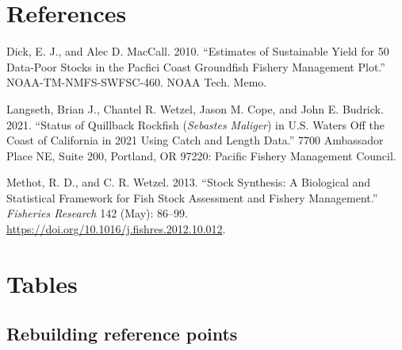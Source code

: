 \documentclass[11pt,
  english,
  a4paper,
]{article}
\begin{document}
\leavevmode\tagmcend\tagstructend\par

\clearpage


\hypertarget{references}{%
\section{References}\label{references}}

\leavevmode\tagmcend\tagstructend


\hypertarget{refs}{}
\leavevmode\hypertarget{ref-DickandMacCall_dbsra_2010}{}%
Dick, E. J., and Alec D. MacCall. 2010. ``Estimates of Sustainable Yield for 50 Data-Poor Stocks in the Pacfici Coast Groundfish Fishery Management Plot.'' NOAA-TM-NMFS-SWFSC-460. NOAA Tech. Memo.

\leavevmode\hypertarget{ref-Langseth_status_2021}{}%
Langseth, Brian J., Chantel R. Wetzel, Jason M. Cope, and John E. Budrick. 2021. ``Status of Quillback Rockfish (\emph{Sebastes Maliger}) in U.S. Waters Off the Coast of California in 2021 Using Catch and Length Data.'' 7700 Ambassador Place NE, Suite 200, Portland, OR 97220: Pacific Fishery Management Council.

\leavevmode\hypertarget{ref-methot_stock_2013}{}%
Methot, R. D., and C. R. Wetzel. 2013. ``Stock Synthesis: A Biological and Statistical Framework for Fish Stock Assessment and Fishery Management.'' \emph{Fisheries Research} 142 (May): 86--99. \url{https://doi.org/10.1016/j.fishres.2012.10.012}.

\leavevmode\tagmcend\tagstructend

\clearpage


\hypertarget{tables}{%
\section{Tables}\label{tables}}

\leavevmode\tagmcend\tagstructend


\hypertarget{rebuilding-reference-points-1}{%
\subsection{Rebuilding reference points}\label{rebuilding-reference-points-1}}
\end{document}
